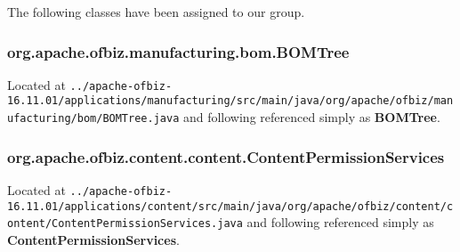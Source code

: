 The following classes have been assigned to our group.
\subsubsection*{org.apache.ofbiz.manufacturing.bom.BOMTree}
	Located at \texttt{../apache-ofbiz-16.11.01/applications/manufacturing/src/main/java/org/apache/ofbiz/manufacturing/bom/BOMTree.java} and following referenced simply as \textbf{BOMTree}.
\subsubsection*{org.apache.ofbiz.content.content.ContentPermissionServices}
	Located at \texttt{../apache-ofbiz-16.11.01/applications/content/src/main/java/org/apache/ofbiz/content/content/ContentPermissionServices.java} and following referenced simply as \textbf{ContentPermissionServices}.
